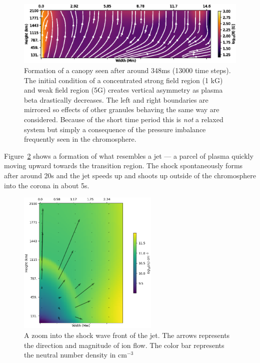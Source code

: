 \documentclass[12pt,upcase]{umlthesis}
\begin{document}
\begin{figure}[ht!]
	\includegraphics[width=1\textwidth]{images/granulegeometry.eps}
	\caption{Formation of a canopy seen after around 348ms (13000 time steps). The initial condition of a concentrated strong field region (1 kG) and weak field region (5G) creates vertical asymmetry as plasma beta drastically decreases. The left and right boundaries are mirrored so effects of other granules behaving the same way are considered. Because of the short time period this is \textit{not} a relaxed system but simply a consequence of the pressure imbalance frequently seen in the chromosphere.}\label{fig:granulegeometry}
\end{figure}

Figure~\ref{fig:spiculeshock} shows a formation of what resembles a jet --- a parcel of plasma quickly moving upward towards the transition region. The shock spontaneously forms after around 20s and the jet speeds up and shoots up outside of the chromosphere into the corona in about 5s. 

\begin{figure}[ht!]
		\centering
		\includegraphics[width=0.6\textwidth]{images/spiculeshock.eps}
		\caption{A zoom into the shock wave front of the jet. The arrows represents the direction and magnitude of ion flow. The color bar represents the neutral number density in cm$^{-3}$}\label{fig:spiculeshock}
\end{figure}
\end{document}
